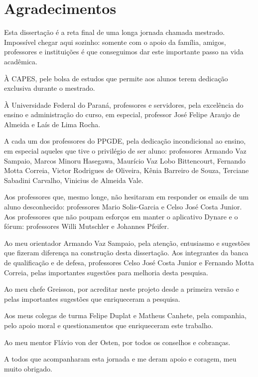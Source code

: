 \documentclass[
thesis.tex
]{subfiles}
\begin{document}
	
	\newpage
	
	\section*{Agradecimentos} %

	Esta dissertação é a reta final de uma longa jornada chamada mestrado. Impossível chegar aqui sozinho: somente com o apoio da família, amigos, professores e instituições é que conseguimos dar este importante passo na vida acadêmica.
	
	À CAPES, pele bolsa de estudos que permite aos alunos terem dedicação exclusiva durante o mestrado.
	
	À Universidade Federal do Paraná, professores e servidores, pela excelência do ensino e administração do curso, em especial, professor José Felipe Araujo de Almeida e Laís de Lima Rocha.

	A cada um dos professores do PPGDE, pela dedicação incondicional ao ensino, em especial aqueles que tive o privilégio de ser aluno: professores Armando Vaz Sampaio, Marcos Minoru Hasegawa, Maurício Vaz Lobo Bittencourt, Fernando Motta Correia, Victor Rodrigues de Oliveira, Kênia Barreiro de Souza, Terciane Sabadini Carvalho, Vinicius de Almeida Vale.

	Aos professores que, mesmo longe, não hesitaram em responder os emails de um aluno desconhecido: professores Mario Solis-Garcia e Celso José Costa Junior. Aos professores que não poupam esforços em manter o aplicativo Dynare e o fórum: professores Willi Mutschler e Johannes Pfeifer.
	
	Ao meu orientador Armando Vaz Sampaio, pela atenção, entusiasmo e sugestões que fizeram diferença na construção desta dissertação. Aos integrantes da banca de qualificação e de defesa, professores Celso José Costa Junior e Fernando Motta Correia, pelas importantes sugestões para melhoria desta pesquisa.

	Ao meu chefe Greisson, por acreditar neste projeto desde a primeira versão e pelas importantes sugestões que enriqueceram a pesquisa.
	
	Aos meus colegas de turma Felipe Duplat e Matheus Canhete, pela companhia, pelo apoio moral e questionamentos que enriqueceram este trabalho.
	
	Ao meu mentor Flávio von der Osten, por todos os conselhos e cobranças.
	
	A todos que acompanharam esta jornada e me deram apoio e coragem, meu muito obrigado.
	
	\thispagestyle{empty}
\end{document}
